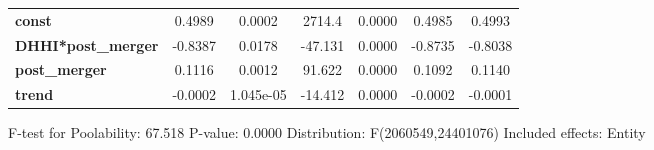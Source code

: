 \documentclass{report}
\begin{document}
\begin{center}
\begin{tabular}{lcccccc}
\midrule
\textbf{const}             &       0.4989       &       0.0002       &      2714.4     &      0.0000      &       0.4985      &       0.4993       \\
\textbf{DHHI*post\_merger} &      -0.8387       &       0.0178       &     -47.131     &      0.0000      &      -0.8735      &      -0.8038       \\
\textbf{post\_merger}      &       0.1116       &       0.0012       &      91.622     &      0.0000      &       0.1092      &       0.1140       \\
\textbf{trend}             &      -0.0002       &     1.045e-05      &     -14.412     &      0.0000      &      -0.0002      &      -0.0001       \\
\bottomrule
\end{tabular}
\end{center}

F-test for Poolability: 67.518 \newline
 P-value: 0.0000 \newline
 Distribution: F(2060549,24401076) \newline
  \newline
 Included effects: Entity
\end{document}
